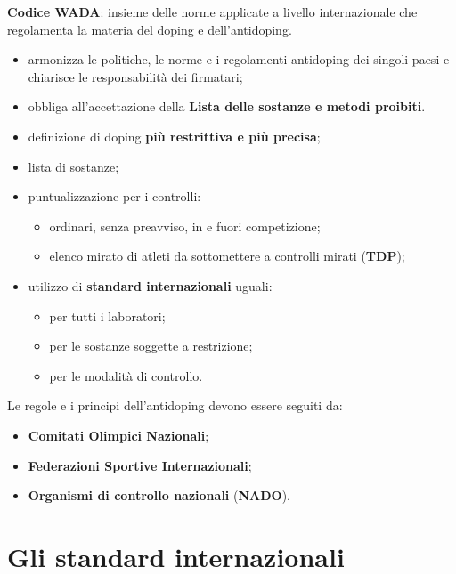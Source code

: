 \textbf{Codice WADA}: insieme delle norme applicate a livello internazionale che regolamenta la
materia del doping e dell'antidoping.
\begin{itemize}
  \item armonizza le politiche, le norme e i regolamenti antidoping dei singoli paesi e
    chiarisce le responsabilità dei firmatari;
  \item obbliga all'accettazione della \textbf{Lista delle sostanze e metodi proibiti}.
\end{itemize}

\begin{itemize}
  \item definizione di doping \textbf{più restrittiva e più precisa};
  \item lista di sostanze;
  \item puntualizzazione per i controlli:
    \begin{itemize}
      \item ordinari, senza preavviso, in e fuori competizione;
      \item elenco mirato di atleti da sottomettere a controlli mirati (\textbf{TDP});
    \end{itemize}
  \item utilizzo di \textbf{standard internazionali} uguali:
    \begin{itemize}
      \item per tutti i laboratori;
      \item per le sostanze soggette a restrizione;
      \item per le modalità di controllo.
    \end{itemize}
\end{itemize}

Le regole e i principi dell'antidoping devono essere seguiti da:
\begin{itemize}
  \item \textbf{Comitati Olimpici Nazionali};
  \item \textbf{Federazioni Sportive Internazionali};
  \item \textbf{Organismi di controllo nazionali} (\textbf{NADO}).
\end{itemize}

\section{Gli standard internazionali}

